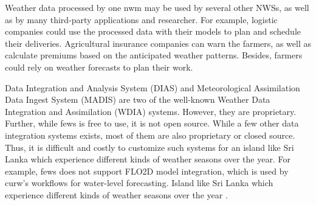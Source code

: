 Weather data processed by one \acrshort{nwm} may be used by several other NWSs, as well as by many third-party applications and researcher. For example, logistic companies could use the processed data with their models to plan and schedule their deliveries. Agricultural insurance companies can warn the farmers, as well as calculate premiums based on the anticipated weather patterns. Besides, farmers could rely on weather forecasts to plan their work. %

Data Integration and Analysis System (DIAS) \cite{Kawasaki2018DataReduction} and Meteorological Assimilation Data Ingest System (MADIS) \cite{Macdermaid2005ArchitectureP2.39} are two of the well-known Weather Data Integration and Assimilation (WDIA) systems. However, they are proprietary. Further, while \acrfull{fews} \cite{Werner2013TheSystem} is free to use, it is not open source. While a few other data integration systems exists, most of them are also proprietary or closed source. Thus, it is difficult and costly to customize such systems for an island like Sri Lanka which experience different kinds of weather seasons over the year. %
For example, \acrshort{fews} does not support FLO2D model integration, which is used by \acrshort{curw}'s workflows for water-level forecasting. %
Island like Sri Lanka which experience different kinds of weather seasons over the year \cite{NaveendrakumarFiveLanka}.

